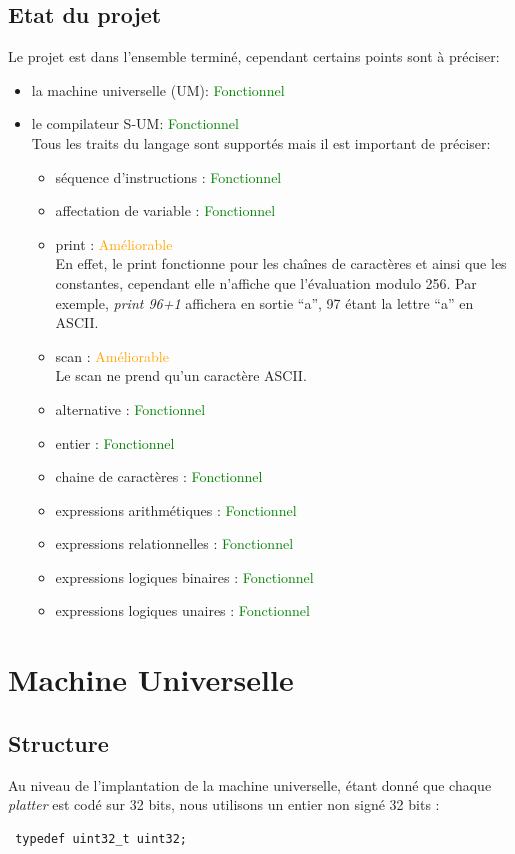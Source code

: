 \documentclass[a4paper,12pt]{report}
\begin{document}
\section{Etat du projet}
Le projet est dans l'ensemble terminé, cependant certains points sont à préciser:
\begin{itemize}
 \item la machine universelle (UM): \textcolor{green}{Fonctionnel}
 \item le compilateur S-UM: \textcolor{green}{Fonctionnel}
 \\ Tous les traits du langage sont supportés mais il est important de préciser:
 \begin{itemize}
  \item séquence d'instructions : \textcolor{green}{Fonctionnel}
  \item affectation de variable : \textcolor{green}{Fonctionnel}
  \item print : \textcolor{orange}{Améliorable}
  \\ En effet, le print fonctionne pour les chaînes de caractères et ainsi que les constantes, cependant elle n'affiche que l'évaluation
  modulo 256. Par exemple, \textit{print 96+1} affichera en sortie ``a'', 97 étant la lettre ``a'' en ASCII.
  \item scan : \textcolor{orange}{Améliorable}
  \\Le scan ne prend qu'un caractère ASCII.
  \item alternative : \textcolor{green}{Fonctionnel}
  \item entier : \textcolor{green}{Fonctionnel}
  \item chaine de caractères : \textcolor{green}{Fonctionnel}
  \item expressions arithmétiques : \textcolor{green}{Fonctionnel}
  \item expressions relationnelles : \textcolor{green}{Fonctionnel}
  \item expressions logiques binaires : \textcolor{green}{Fonctionnel}
  \item expressions logiques unaires : \textcolor{green}{Fonctionnel}
 \end{itemize}
\end{itemize}


\chapter{Machine Universelle}
\section{Structure}
Au niveau de l'implantation de la machine universelle, étant donné que chaque \textit{platter} est codé sur 32 bits, nous utilisons
un entier non signé 32 bits :
\begin{verbatim}
 typedef uint32_t uint32;
\end{verbatim}
\end{document}
